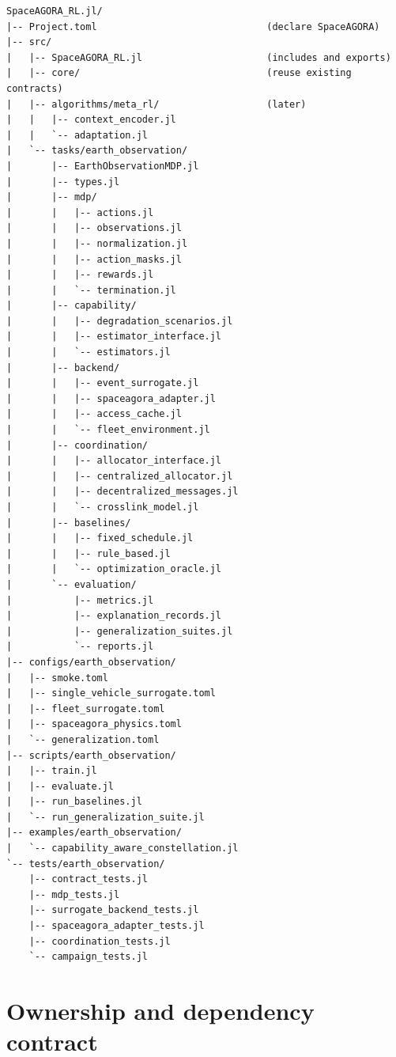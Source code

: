 \documentclass[11pt]{article}
\begin{document}
\begin{verbatim}
SpaceAGORA_RL.jl/
|-- Project.toml                              (declare SpaceAGORA)
|-- src/
|   |-- SpaceAGORA_RL.jl                      (includes and exports)
|   |-- core/                                 (reuse existing contracts)
|   |-- algorithms/meta_rl/                   (later)
|   |   |-- context_encoder.jl
|   |   `-- adaptation.jl
|   `-- tasks/earth_observation/
|       |-- EarthObservationMDP.jl
|       |-- types.jl
|       |-- mdp/
|       |   |-- actions.jl
|       |   |-- observations.jl
|       |   |-- normalization.jl
|       |   |-- action_masks.jl
|       |   |-- rewards.jl
|       |   `-- termination.jl
|       |-- capability/
|       |   |-- degradation_scenarios.jl
|       |   |-- estimator_interface.jl
|       |   `-- estimators.jl
|       |-- backend/
|       |   |-- event_surrogate.jl
|       |   |-- spaceagora_adapter.jl
|       |   |-- access_cache.jl
|       |   `-- fleet_environment.jl
|       |-- coordination/
|       |   |-- allocator_interface.jl
|       |   |-- centralized_allocator.jl
|       |   |-- decentralized_messages.jl
|       |   `-- crosslink_model.jl
|       |-- baselines/
|       |   |-- fixed_schedule.jl
|       |   |-- rule_based.jl
|       |   `-- optimization_oracle.jl
|       `-- evaluation/
|           |-- metrics.jl
|           |-- explanation_records.jl
|           |-- generalization_suites.jl
|           `-- reports.jl
|-- configs/earth_observation/
|   |-- smoke.toml
|   |-- single_vehicle_surrogate.toml
|   |-- fleet_surrogate.toml
|   |-- spaceagora_physics.toml
|   `-- generalization.toml
|-- scripts/earth_observation/
|   |-- train.jl
|   |-- evaluate.jl
|   |-- run_baselines.jl
|   `-- run_generalization_suite.jl
|-- examples/earth_observation/
|   `-- capability_aware_constellation.jl
`-- tests/earth_observation/
    |-- contract_tests.jl
    |-- mdp_tests.jl
    |-- surrogate_backend_tests.jl
    |-- spaceagora_adapter_tests.jl
    |-- coordination_tests.jl
    `-- campaign_tests.jl
\end{verbatim}

\section{Ownership and dependency contract}
\end{document}
